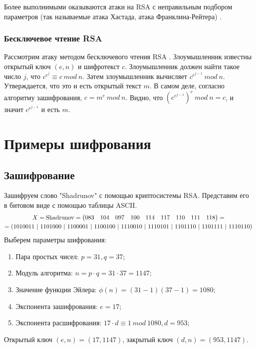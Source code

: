 Более выполнимыми оказываются атаки на RSA с неправильным подбором параметров (так называемые атака Хастада, атака Франклина-Рейтера) \cite{wiki:rsa_anal}.

\subsubsection{Бесключевое чтение RSA}
Рассмотрим атаку методом бесключевого чтения RSA \cite{rsa_attack}. Злоумышленник известны открытый ключ $(e,n)$ и шифротекст $c$. Злоумышленник должен найти такое число $j$, что $c^{e^j} \equiv c \ mod \ n $. Затем злоумышленник вычисляет $c^{e^{j - 1}} \ mod \ n $. Утверждается, что это и есть открытый текст $m$. В самом деле, согласно алгоритму зашифрования, $c = m^e \ mod \ n$. Видно, что $(c^{e^{j - 1}})^e \ mod \ n = c$, и значит $c^{e^{j - 1}}$ и есть $m$. 
\newpage



\section{Примеры шифрования}
\subsection{Зашифрование}
Зашифруем слово "Shadrunov" с помощью криптосистемы RSA. Представим его в битовом виде с помощью таблицы ASCII. 
\begin{gather*}
    X = \textnormal{Shadrunov} = \begin{pmatrix}
        083 & 104 & 097 & 100 & 114 & 117 & 110 & 111 & 118
    \end{pmatrix} = \\ = (
        1010011 \ | \ 1101000 \ | \ 1100001 \ | \ 1100100 \ | \ 1110010 \ | \ 1110101 \ | \ 1101110 \ | \ 1101111 \ | \ 1110110
    )
\end{gather*}
Выберем параметры шифрования:
\begin{enumerate}
    \item Пара простых чисел: $p = 31, q = 37$;
    \item Модуль алгоритма: $n = p \cdot q = 31 \cdot 37 = 1147$;
    \item Значение функции Эйлера: $\phi(n) = (31 - 1)(37 - 1) = 1080$;
    \item Экспонента зашифрования: $e = 17$;
    \item Экспонента расшифрования: $17 \cdot d \equiv 1 \ mod \ 1080, d = 953$;
\end{enumerate}
Открытый ключ $(e, n) = (17, 1147)$, закрытый ключ $(d, n) = (953, 1147)$.

